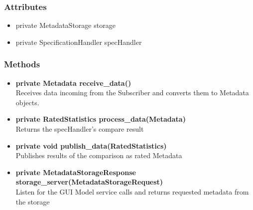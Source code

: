 \subsubsection{Attributes}
\begin{itemize}
	\item private MetadataStorage storage
	\item private SpecificationHandler specHandler
\end{itemize}
\subsubsection{Methods}
\begin{itemize}
	\item \textbf{private Metadata receive\_data()}\\
	Receives data incoming from the Subscriber and converts them to Metadata objects.
	\item \textbf{private RatedStatistics process\_data(Metadata)}\\
	Returns the specHandler's compare result
	\item \textbf{private void publish\_data(RatedStatistics)}\\
	Publishes results of the comparison as rated Metadata
	\item \textbf{private MetadataStorageResponse storage\_server(MetadataStorageRequest)}\\
	Listen for the GUI Model service calls and returns requested metadata from the storage
\end{itemize}



